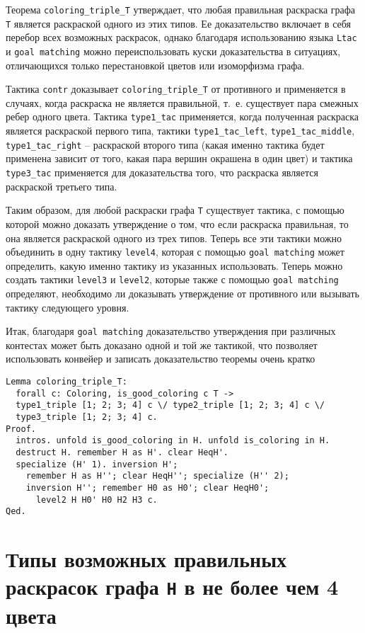 Теорема {\tt coloring\_triple\_T} утверждает, что любая правильная раскраска графа {\tt T} является раскраской одного из этих типов. Ее доказательство включает в себя перебор всех возможных раскрасок, однако благодаря использованию языка {\tt Ltac} и {\tt goal matching} можно переиспользовать куски доказательства в ситуациях, отличающихся только перестановкой цветов или изоморфизма графа.

Тактика {\tt contr} доказывает {\tt coloring\_triple\_T} от противного и применяется в случаях, когда раскраска не является правильной, т.~е. существует пара смежных ребер одного цвета. Тактика {\tt type1\_tac} применяется, когда полученная раскраска является раскраской первого типа, тактики {\tt type1\_tac\_left}, {\tt type1\_tac\_middle}, {\tt type1\_tac\_right} -- раскраской второго типа (какая именно тактика будет применена зависит от того, какая пара вершин окрашена в один цвет) и тактика {\tt type3\_tac} применяется для доказательства того, что раскраска является раскраской третьего типа.

Таким образом, для любой раскраски графа {\tt T} существует тактика, с помощью которой можно доказать утверждение о том, что если раскраска правильная, то она является раскраской одного из трех типов. Теперь все эти тактики можно объединить в одну тактику {\tt level4}, которая с помощью {\tt goal matching} может определить, какую именно тактику из указанных использовать. Теперь можно создать тактики {\tt level3} и {\tt level2}, которые также с помощью {\tt goal matching} определяют, необходимо ли доказывать утверждение от противного или вызывать тактику следующего уровня.

Итак, благодаря {\tt goal matching} доказательство утверждения при различных контестах может быть доказано одной и той же тактикой, что позволяет использовать конвейер и записать доказательство теоремы очень кратко

\begin{verbatim}
Lemma coloring_triple_T:
  forall c: Coloring, is_good_coloring c T ->
  type1_triple [1; 2; 3; 4] c \/ type2_triple [1; 2; 3; 4] c \/
  type3_triple [1; 2; 3; 4] c.
Proof.
  intros. unfold is_good_coloring in H. unfold is_coloring in H. 
  destruct H. remember H as H'. clear HeqH'. 
  specialize (H' 1). inversion H';
    remember H as H''; clear HeqH''; specialize (H'' 2); 
    inversion H''; remember H0 as H0'; clear HeqH0';
      level2 H H0' H0 H2 H3 c.
Qed.
\end{verbatim}

\section{Типы возможных правильных раскрасок графа {\tt H} в не более чем 4 цвета}


